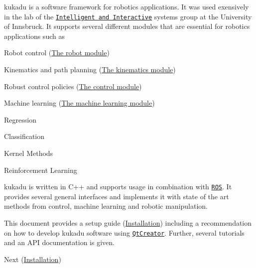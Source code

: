 kukadu is a software framework for robotics applications. It was used exensively in the lab of the \href{http://iis.uibk.ac.at}{\tt Intelligent and Interactive} systems group at the University of Innsbruck. It supports several different modules that are essential for robotics applications such as
\begin{DoxyItemize}
\item Robot control (\hyperlink{robotpage}{The robot module})
\item Kinematics and path planning (\hyperlink{kinematicspage}{The kinematics module})
\item Robust control policies (\hyperlink{controlpage}{The control module})
\item Machine learning (\hyperlink{mlpage}{The machine learning module})
\begin{DoxyItemize}
\item Regression
\item Classification
\item Kernel Methods
\item Reinforcement Learning
\end{DoxyItemize}
\end{DoxyItemize}

kukadu is written in C++ and supports usage in combination with \href{http://www.ros.org/}{\tt R\-O\-S}. It provides several general interfaces and implements it with state of the art methods from control, machine learning and robotic manipulation.

This document provides a setup guide (\hyperlink{installationpage}{Installation}) including a recommendation on how to develop kukadu software using \href{https://www.qt.io/ide/}{\tt Qt\-Creator}. Further, several tutorials and an A\-P\-I documentation is given.

Next (\hyperlink{installationpage}{Installation}) 